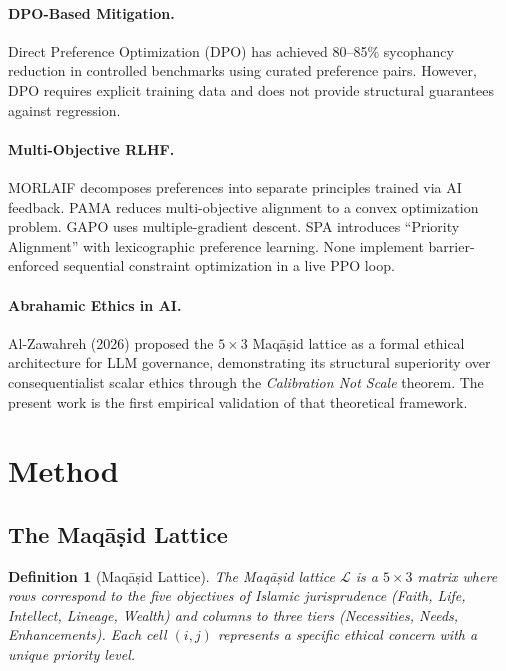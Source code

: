 \documentclass[11pt,a4paper]{article}
\newtheorem{definition}{Definition}
\begin{document}
\paragraph{DPO-Based Mitigation.} Direct Preference Optimization (DPO) has achieved 80--85\% sycophancy reduction in controlled benchmarks using curated preference pairs. However, DPO requires explicit training data and does not provide structural guarantees against regression.

\paragraph{Multi-Objective RLHF.} MORLAIF \citep{morlaif2024} decomposes preferences into separate principles trained via AI feedback. PAMA \citep{he2024pama} reduces multi-objective alignment to a convex optimization problem. GAPO \citep{gapo2025} uses multiple-gradient descent. SPA \citep{spa2025} introduces ``Priority Alignment'' with lexicographic preference learning. None implement barrier-enforced sequential constraint optimization in a live PPO loop.

\paragraph{Abrahamic Ethics in AI.} Al-Zawahreh (2026) proposed the $5\times3$ Maq\=a\d{s}id lattice as a formal ethical architecture for LLM governance, demonstrating its structural superiority over consequentialist scalar ethics through the \emph{Calibration Not Scale} theorem. The present work is the first empirical validation of that theoretical framework.

\section{Method}

\subsection{The Maq\=a\d{s}id Lattice}

\begin{definition}[Maq\=a\d{s}id Lattice]
The Maq\=a\d{s}id lattice $\mathcal{L}$ is a $5\times3$ matrix where rows correspond to the five objectives of Islamic jurisprudence (Faith, Life, Intellect, Lineage, Wealth) and columns to three tiers (Necessities, Needs, Enhancements). Each cell $(i,j)$ represents a specific ethical concern with a unique priority level.
\end{definition}
\end{document}
